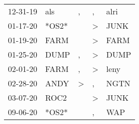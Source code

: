 \begin{supertabular}{p{0.07\textwidth}p{0.06\textwidth}p{0.02\textwidth}p{0.02\textwidth}p{0.06\textwidth}}
 12-31-19\textsuperscript{} &   als\textsuperscript{} &             , &             , &  alri\textsuperscript{} \\
 01-17-20\textsuperscript{} &                   *OS2* &               &  \textgreater &  JUNK\textsuperscript{} \\
 01-19-20\textsuperscript{} &  FARM\textsuperscript{} &               &  \textgreater &  FARM\textsuperscript{} \\
 01-25-20\textsuperscript{} &  DUMP\textsuperscript{} &             , &  \textgreater &  DUMP\textsuperscript{} \\
 02-01-20\textsuperscript{} &  FARM\textsuperscript{} &             , &  \textgreater &  leny\textsuperscript{} \\
 02-28-20\textsuperscript{} &  ANDY\textsuperscript{} &  \textgreater &             , &  NGTN\textsuperscript{} \\
 03-07-20\textsuperscript{} &  ROC2\textsuperscript{} &               &  \textgreater &  JUNK\textsuperscript{} \\
 09-06-20\textsuperscript{} &                   *OS2* &               &             , &   WAP\textsuperscript{} \\
\end{supertabular}
